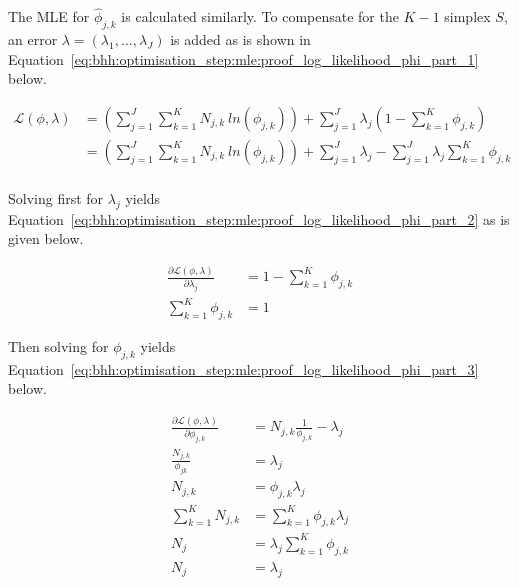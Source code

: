 The \acs{MLE} for $\hat{\phi}_{j, k} $ is calculated similarly. To compensate for the $K-1$ simplex $S$, an error $\lambda = (\lambda_{1}, \dots, \lambda_{J})$ is added as is shown in Equation~\eqref{eq:bhh:optimisation_step:mle:proof_log_likelihood_phi_part_1} below.

\begin{equation}
      \label{eq:bhh:optimisation_step:mle:proof_log_likelihood_phi_part_1}
      \begin{split}
            \mathcal{L}(\phi, \lambda)
            &=  \left( \sum_{j=1}^{J} \sum_{k=1}^{K} N_{j,k} \ ln \left( \phi_{j,k} \right) \right) + \sum_{j=1}^{J} \lambda_{j} \left( 1 - \sum_{k=1}^{K} \phi_{j,k} \right) \\
            &=  \left( \sum_{j=1}^{J} \sum_{k=1}^{K} N_{j,k} \ ln \left( \phi_{j,k} \right) \right) + \sum_{j=1}^{J} \lambda_{j} - \sum_{j=1}^{J} \lambda_{j} \sum_{k=1}^{K} \phi_{j,k} \\
      \end{split}
\end{equation}

Solving first for $\lambda_{j}$ yields Equation~\eqref{eq:bhh:optimisation_step:mle:proof_log_likelihood_phi_part_2} as is given below.

\begin{equation}
      \label{eq:bhh:optimisation_step:mle:proof_log_likelihood_phi_part_2}
      \begin{split}
            \frac{\partial \mathcal{L}(\phi, \lambda)}{\partial \lambda_{j}} &= 1 - \sum_{k=1}^{K} \phi_{j,k}  \\
            \sum_{k=1}^{K} \phi_{j,k}  &= 1
      \end{split}
\end{equation}

Then solving for $\phi_{j,k}$ yields Equation~\eqref{eq:bhh:optimisation_step:mle:proof_log_likelihood_phi_part_3} below.

\begin{equation}
      \label{eq:bhh:optimisation_step:mle:proof_log_likelihood_phi_part_3}
      \begin{split}
            \frac{\partial \mathcal{L}(\phi, \lambda)}{\partial \phi_{j,k}} &= N_{j,k} \frac{1}{\phi_{j,k}}  - \lambda_{j} \\
            \frac{N_{j,k}}{\phi_{jk}} &= \lambda_{j} \\
            N_{j,k} &= \phi_{j,k} \lambda_{j} \\
            \sum_{k=1}^{K} N_{j,k} &= \sum_{k=1}^{K} \phi_{j,k} \lambda_{j} \\
            N_{j} &= \lambda_{j} \sum_{k=1}^{K} \phi_{j,k} \\
            N_{j} &= \lambda_{j}
      \end{split}
\end{equation}

